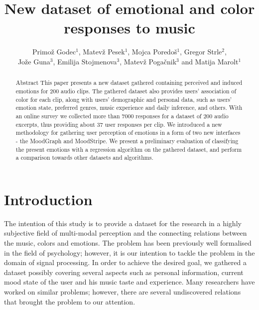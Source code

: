 \documentclass[a4paper]{article}
\begin{document}
\title{New dataset of emotional and color responses to music}

\author{Primož Godec$^{1}$, Matevž Pesek$^{1}$, Mojca Poredoš$^{1}$, Gregor Strle$^{2}$,\\ Jože Guna$^{3}$, Emilija Stojmenova$^{3}$, Matevž Pogačnik$^{3}$ and Matija Marolt$^{1}$} %



\maketitle

\begin{abstract}{Abstract}
This paper presents a new dataset gathered containing perceived and induced emotions for 200 audio clips. The gathered dataset also provides users' association of color for each clip, along with users' demographic and personal data, such as users' emotion state, preferred genres, music experience and daily inference, and others. With an online survey we collected more than 7000 responses for a dataset of 200 audio excerpts, thus providing about 37 user responses per clip. We introduced a new methodology for gathering user perception of emotions in a form of two new interfaces - the MoodGraph and MoodStripe. We present a preliminary evaluation of classifying the present emotions with a regression algorithm on the gathered dataset, and perform a comparison towards other datasets and algorithms.
\end{abstract}

\section{Introduction}

The intention of this study is to provide a dataset for the research in a highly subjective field of multi-modal perception and the connecting relations between the music, colors and emotions. The problem has been previously well formalised in the field of psychology; however, it is our intention to tackle the problem in the domain of signal processing. In order to achieve the desired goal, we gathered a dataset possibly covering several aspects such as personal information, current mood state of the user and his music taste and experience. Many researchers have worked on similar problems; however, there are several undiscovered relations that brought the problem to our attention. 
\end{document}
